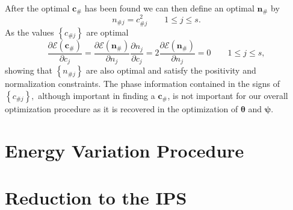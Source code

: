 \documentclass[aps,preprint]{revtex4}%
\begin{document}
After the optimal $\mathbf{c}_{\#}$ has been found we can then define an
optimal $\mathbf{n}_{\#}$ by
\begin{equation}
n_{\#j}=c_{\#j}^{2}\qquad1\leq j\leq s.
\end{equation}
As the values $\left\{  c_{\#j}\right\}  $ are optimal
\begin{equation}
\frac{\partial\mathbf{\mathcal{E}\left(  \mathbf{c}_{\#}\right)  }}{\partial
c_{j}}=\frac{\partial\mathbf{\mathcal{E}\left(  \mathbf{n}_{\#}\right)  }%
}{\partial n_{j}}\frac{\partial n_{j}}{\partial c_{j}}=2\frac{\partial
\mathbf{\mathcal{E}\left(  \mathbf{n}_{\#}\right)  }}{\partial n_{j}}%
=0\qquad1\leq j\leq s,
\end{equation}
showing that $\left\{  n_{\#j}\right\}  $ are also optimal and satisfy the
positivity and normalization constraints. The phase information contained in
the signs of $\left\{  c_{\#j}\right\}  ,$ although important in finding a
$\mathbf{c}_{\#}$, is not important for our overall optimization procedure as
it is recovered in the optimization of $\mathbf{\theta}$ and $\mathbf{\psi}$.

\section{Energy Variation Procedure \label{procedure}}

\section{Reduction to the IPS \label{IPS}}
\end{document}

